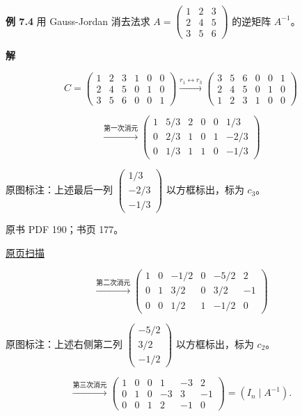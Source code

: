 \documentclass[
  10pt,
  fontset=fandol]{ctexart}
\begin{document}
\textbf{例 7.4} 用 Gauss-Jordan 消去法求 \(A=\begin{pmatrix}1&2&3\\2&4&5\\3&5&6\end{pmatrix}\) 的逆矩阵 \(A^{-1}\)。

\textbf{解}

\[
C=\left(\begin{array}{rrr|rrr}
1&2&3&1&0&0\\
2&4&5&0&1&0\\
3&5&6&0&0&1
\end{array}\right)
\xrightarrow{r_1\leftrightarrow r_3}
\left(\begin{array}{rrr|rrr}
\boxed{3}&5&6&0&0&1\\
2&4&5&0&1&0\\
1&2&3&1&0&0
\end{array}\right)
\]

\[
\xrightarrow{\text{第一次消元}}
\left(\begin{array}{rrr|rrr}
1&5/3&2&0&0&1/3\\
0&2/3&1&0&1&-2/3\\
0&1/3&1&1&0&-1/3
\end{array}\right)
\]

原图标注：上述最后一列 \(\begin{pmatrix}1/3\\-2/3\\-1/3\end{pmatrix}\) 以方框标出，标为 \(c_3\)。

\clearpage

原书 PDF 190；书页 177。

\href{/Users/xiangjunfeng/Desktop/数值计算专用/numerical-analysis/book/source-images/pdf-190.jpeg}{原页扫描}

\[
\xrightarrow{\text{第二次消元}}
\left(\begin{array}{rrr|rrr}
1&0&-1/2&0&-5/2&2\\
0&1&3/2&0&3/2&-1\\
0&0&\boxed{1/2}&1&-1/2&0
\end{array}\right)
\]

原图标注：上述右侧第二列 \(\begin{pmatrix}-5/2\\3/2\\-1/2\end{pmatrix}\) 以方框标出，标为 \(c_2\)。

\[
\xrightarrow{\text{第三次消元}}
\left(\begin{array}{rrr|rrr}
1&0&0&1&-3&2\\
0&1&0&-3&3&-1\\
0&0&1&2&-1&0
\end{array}\right)=(I_n\mid A^{-1}).
\]
\end{document}
